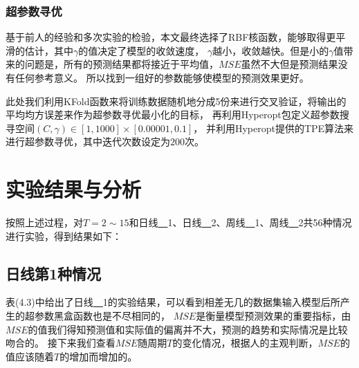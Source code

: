 \subsubsection{超参数寻优}

基于前人的经验和多次实验的检验，本文最终选择了RBF核函数，能够取得更平滑的估计，其中$\gamma$的值决定了模型的收敛速度，
$\gamma$越小，收敛越快。但是小的$\gamma$值带来的问题是，所有的预测结果都将接近于平均值，$MSE$虽然不大但是预测结果没有任何参考意义。
所以找到一组好的参数能够使模型的预测效果更好。

此处我们利用KFold函数来将训练数据随机地分成5份来进行交叉验证，将输出的平均均方误差来作为超参数寻优最小化的目标，
再利用Hyperopt包定义超参数搜寻空间$(C,\gamma)\in[1, 1000]\times[0.00001, 0.1]$，
并利用Hyperopt提供的TPE算法来进行超参数寻优，其中迭代次数设定为$200$次。

\section{实验结果与分析}

按照上述过程，对$T=2\sim15$和日线\underline{~~}1、日线\underline{~~}2、周线\underline{~~}1、周线\underline{~~}2共56种情况进行实验，得到结果如下：

\subsection{日线第1种情况}

表(4.3)中给出了日线\underline{~~}1的实验结果，可以看到相差无几的数据集输入模型后所产生的超参数黑盒函数也是不尽相同的，
$MSE$是衡量模型预测效果的重要指标，由$MSE$的值我们得知预测值和实际值的偏离并不大，预测的趋势和实际情况是比较吻合的。
接下来我们查看$MSE$随周期$T$的变化情况，根据人的主观判断，$MSE$的值应该随着$T$的增加而增加的。

